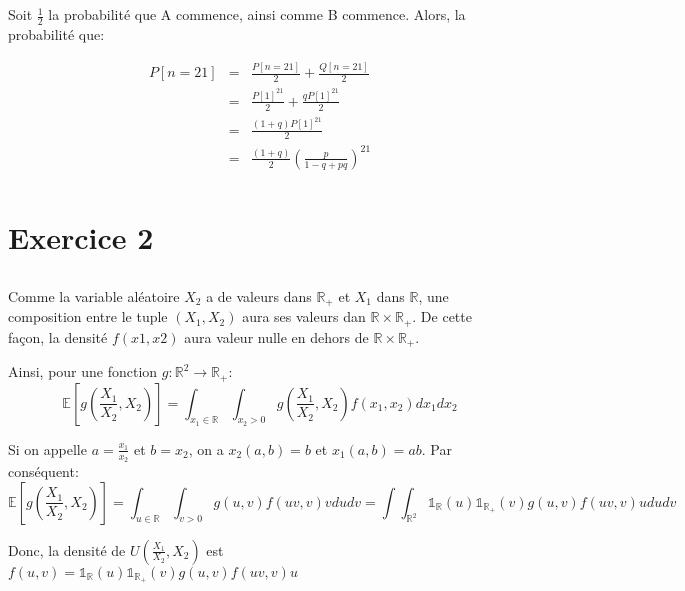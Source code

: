 \documentclass[a4paper]{article}
\begin{document}
\subsection{}
Soit $\frac{1}{2}$ la probabilité que A commence, ainsi comme B commence.
Alors, la probabilité que:

\begin{eqnarray*}
 P[n=21] &=&\frac{P[n=21]}{2}+\frac{Q[n=21]}{2}\\
 &=& \frac{P[1]^{21}}{2}+\frac{qP[1]^{21}}{2}\\
 &=& \frac{(1+q)P[1]^{21}}{2}\\
 &=& \frac{(1+q)}{2}(\frac{p}{1-q+pq})^{21}\\
\end{eqnarray*}



\section{Exercice 2 }
\subsection{}

Comme la variable aléatoire $X_2$ a de valeurs dans $\mathbb{R}_+$ et $X_1$ dans
$\mathbb{R}$, une composition  entre le tuple $(X_1 , X_2)$  aura ses valeurs dan
$\mathbb{R}\times\mathbb{R}_+$. De  cette façon,  la densité $f(x1,  x2)$ aura
valeur nulle en dehors de $\mathbb{R}\times\mathbb{R}_+$.

Ainsi, pour une fonction $g:\mathbb{R}^2 \rightarrow \mathbb{R}_+$:
\begin{equation}
 \mathbb{E}[g(\frac{X_1}{X_2},X_2)]=\int_{x_1 \in \mathbb{R}} \int_{x_2>0}g(\frac{X_1}{X_2},X_2)f(x_1,x_2)dx_1dx_2
\end{equation}

Si   on  appelle   $a=\frac{x_1}{x_2}$  et   $b=x_2$,  on   a   $x_2(a,b)=b$  et
$x_1(a,b)=ab$. Par conséquent:
\begin{equation}
 \mathbb{E}[g(\frac{X_1}{X_2},X_2)]=\int_{u            \in           \mathbb{R}}
 \int_{v>0}g(u,v)f(uv,v)vdudv=\int \int_{\mathbb{R}^2} \mathds{1}_\mathbb{R}(u)\mathds{1}_{\mathbb{R}_+}(v)g(u,v)f(uv,v)ududv
\end{equation}

Donc, la densité de $U(\frac{X_1}{X_2},X_2)$ est $f(u,v)=\mathds{1}_\mathbb{R}(u)\mathds{1}_{\mathbb{R}_+}(v)g(u,v)f(uv,v)u$

\subsection{}
\end{document}
